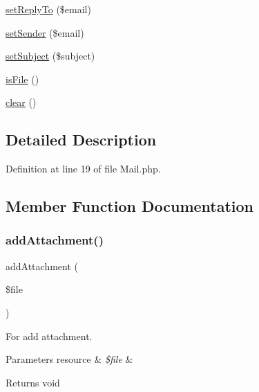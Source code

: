 \begin{DoxyCompactItemize}
\item 
\mbox{\hyperlink{class_zest_1_1_mail_1_1_mail_a18845dc0e743855fef7e3fd8a2375f4b}{set\+Reply\+To}} (\$email)
\item 
\mbox{\hyperlink{class_zest_1_1_mail_1_1_mail_a1a5cb2c6afc792ad117d5ba30e52b5de}{set\+Sender}} (\$email)
\item 
\mbox{\hyperlink{class_zest_1_1_mail_1_1_mail_a971f2abb85a2e0fc85954322896d6b80}{set\+Subject}} (\$subject)
\item 
\mbox{\hyperlink{class_zest_1_1_mail_1_1_mail_a746fee70ac0f3dcd5543ff033dabbc97}{is\+File}} ()
\item 
\mbox{\hyperlink{class_zest_1_1_mail_1_1_mail_aa821bec12eaa7e0f649397c9675ff505}{clear}} ()
\end{DoxyCompactItemize}


\subsection{Detailed Description}


Definition at line 19 of file Mail.\+php.



\subsection{Member Function Documentation}
\mbox{\label{class_zest_1_1_mail_1_1_mail_ac987d3ae027d5659e29971c057067a74}} 
\subsubsection{\texorpdfstring{add\+Attachment()}{addAttachment()}}
{\footnotesize\ttfamily add\+Attachment (\begin{DoxyParamCaption}\item[{}]{\$file }\end{DoxyParamCaption})}

For add attachment.


\begin{DoxyParams}[1]{Parameters}
resource & {\em \$file} & \\
\hline
\end{DoxyParams}
\begin{DoxyReturn}{Returns}
void 
\end{DoxyReturn}


